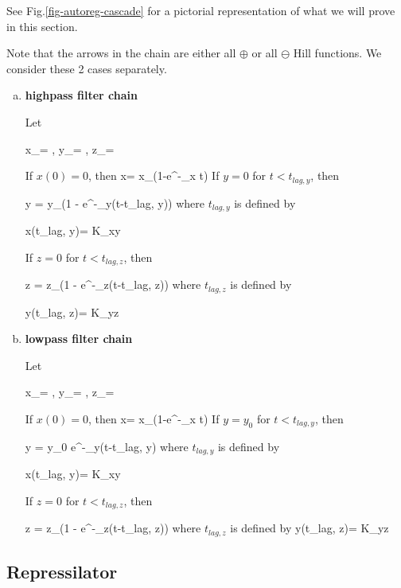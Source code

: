 See Fig.\ref{fig-autoreg-cascade}
for a pictorial
representation of what we will prove in this section.

Note that the arrows in the chain are
either all $\oplus$ or all $\ominus$ Hill functions.
We consider these 2 cases separately.

\begin{enumerate}[(a)]
\item {\bf highpass filter chain}

Let 

\beq
x_\infty = \;,\;\;
y_\infty = \;,\;\;
z_\infty = 
\eeq
 
If $x(0)=0$, then
\beq
x=
x_\infty(1-e^{-\alp_x t})
\quad{}
\eeq
If $y=0$ for $t<t_{lag, y}$, then

\beq
y = y_\infty(1 - e^{-\alp_y(t-t_{lag, y})})
\quad{}
\eeq
where $t_{lag,y}$ is defined by

\beq
x(t_{lag, y})= K_{x\rarrow y}
\eeq

If $z=0$ for $t<t_{lag, z}$, then

\beq
z = z_\infty(1 - e^{-\alp_z(t-t_{lag, z})})
\quad{}
\eeq
where $t_{lag, z}$ is defined by

\beq
y(t_{lag, z})= K_{y\rarrow z}
\eeq

\item {\bf lowpass filter chain}

Let 

\beq
x_\infty = \;,\;\;
y_\infty = \;,\;\;
z_\infty = 
\eeq
 
If $x(0)=0$, then
\beq
x=
x_\infty(1-e^{-\alp_x t})
\quad{}
\eeq
If $y=y_0$ for $t<t_{lag, y}$, then

\beq
y = y_0 e^{-\alp_y(t-t_{lag, y})}
\quad{}
\eeq
where $t_{lag, y}$ is defined by

\beq
x(t_{lag, y})= K_{x\rarrow y}
\eeq

If $z=0$ for $t<t_{lag, z}$, then

\beq
z = z_\infty(1 - e^{-\alp_z(t-t_{lag, z})})
\quad{}
\eeq
where $t_{lag, z}$
is defined by
\beq
y(t_{lag, z})= K_{y\rarrow z}
\eeq
\end{enumerate}


\subsection{Repressilator}

